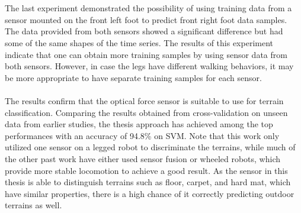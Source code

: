 \documentclass[USenglish]{ifimaster}  %
\begin{document}
\\
\\
The last experiment demonstrated the possibility of using training data from a sensor mounted on the front left foot to predict front right foot data samples. The data provided from both sensors showed a significant difference but had some of the same shapes of the time series. The results of this experiment indicate that one can obtain more training samples by using sensor data from both sensors. However, in case the legs have different walking behaviors, it may be more appropriate to have separate training samples for each sensor. 
\\
\\
The results confirm that the optical force sensor is suitable to use for terrain classification. Comparing the results obtained from cross-validation on unseen data from earlier studies, the thesis approach has achieved among the top performances with an accuracy of 94.8\% on SVM. Note that this work only utilized one sensor on a legged robot to discriminate the terrains, while much of the other past work have either used sensor fusion or wheeled robots, which provide more stable locomotion to achieve a good result. As the sensor in this thesis is able to distinguish terrains such as floor, carpet, and hard mat, which have similar properties, there is a high chance of it correctly predicting outdoor terrains as well.
	
\end{document}
